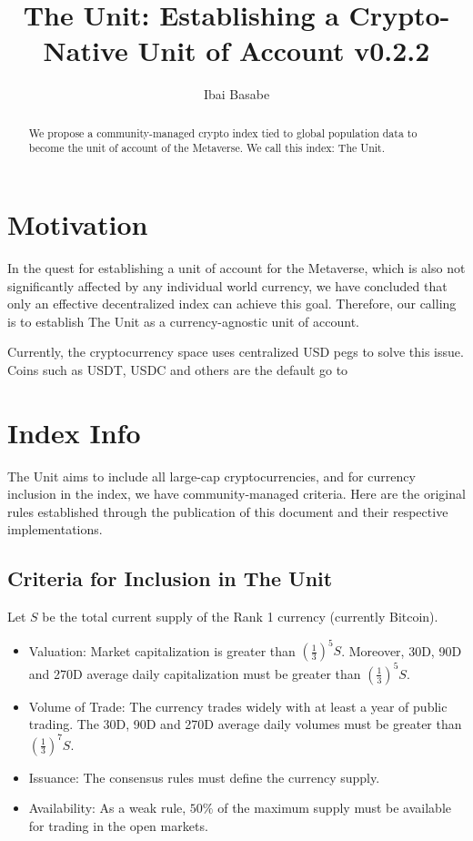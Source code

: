 \documentclass[12pt]{article}
\title{The Unit: Establishing a Crypto-Native Unit of Account v0.2.2}
\author{Ibai Basabe}
\begin{document}
\pagecolor{yellow!15!}

\date{}

\maketitle


\begin{abstract}
We propose a community-managed crypto index tied to global population data to become the unit of account of the Metaverse. We call this index: The Unit. 
\end{abstract}


\tableofcontents
\newpage

\section{Motivation}

In the quest for establishing a unit of account for the Metaverse, which is also not significantly affected by any individual world currency, we have concluded that only an effective decentralized index can achieve this goal. Therefore, our calling is to establish The Unit as a currency-agnostic unit of account. 

Currently, the cryptocurrency space uses centralized USD pegs to solve this issue. Coins such as USDT, USDC and others are the default go to  

\section{Index Info}

The Unit aims to include all large-cap cryptocurrencies, and for currency inclusion in the index, we have community-managed criteria. Here are the original rules established through the publication of this document and their respective implementations.

\subsection{Criteria for Inclusion in The Unit}

Let $S$ be the total current supply of the Rank 1 currency (currently Bitcoin).

\begin{itemize}

\item Valuation: Market capitalization is greater than $\left(\frac{1}{3}\right)^5 S$. Moreover, 30D, 90D and 270D average daily capitalization must be greater than $\left(\frac{1}{3}\right)^5 S$.
\item Volume of Trade: The currency trades widely with at least a year of public trading. The 30D, 90D and 270D average daily volumes must be greater than $\left(\frac{1}{3}\right)^7 S$.
\item Issuance: The consensus rules must define the currency supply.
\item Availability: As a weak rule, $50\%$ of the maximum supply must be available for trading in the open markets.

\end{itemize}
\end{document}

